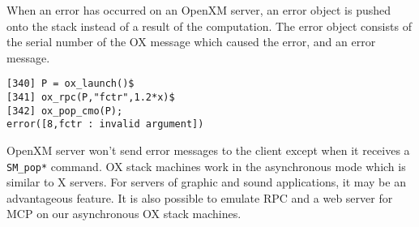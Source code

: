 When an error has occurred on an OpenXM server,
an error object is pushed onto the stack 
instead of a result of the computation.
The error object consists of the serial number of the OX message
which caused the error, and an error message.
\begin{verbatim}
[340] P = ox_launch()$
[341] ox_rpc(P,"fctr",1.2*x)$
[342] ox_pop_cmo(P);
error([8,fctr : invalid argument])
\end{verbatim}

OpenXM server won't send error messages to the client
except when it receives a {\tt SM\_pop*} command.
OX stack machines work in the asynchronous mode which is similar 
to X servers.
For servers of graphic and sound applications, 
it may be an advantageous feature.
It is also possible to emulate RPC and a web server for MCP \cite{iamc} 
on our asynchronous OX stack machines.





